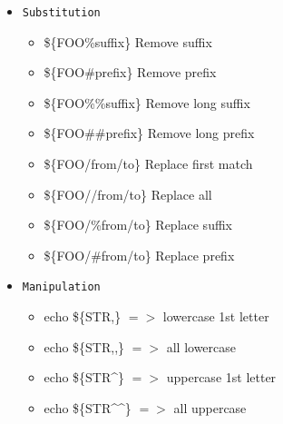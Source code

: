 \begin{frame}[fragile]{\subsubsecname}
  \begin{itemize}
    \item \texttt{Substitution}
    \begin{itemize}
      \item \$\{FOO\%suffix\} Remove suffix
      \item \$\{FOO\#prefix\} Remove prefix
      \item \$\{FOO\%\%suffix\} Remove long suffix
      \item \$\{FOO\#\#prefix\} Remove long prefix
      \item \$\{FOO/from/to\} Replace first match
      \item \$\{FOO//from/to\} Replace all
      \item \$\{FOO/\%from/to\} Replace suffix
      \item \$\{FOO/\#from/to\} Replace prefix
    \end{itemize}
    \item \texttt{Manipulation}
    \begin{itemize}
      \item echo \$\{STR,\} $=>$ lowercase 1st letter
      \item echo \$\{STR,,\} $=>$ all lowercase
      \item echo \$\{STR\textasciicircum{}\} $=>$ uppercase 1st letter
      \item echo \$\{STR\textasciicircum{}\textasciicircum{}\} $=>$ all uppercase
    \end{itemize}
  \end{itemize}
\end{frame}
